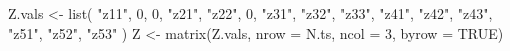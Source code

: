 \begin{Schunk}
\begin{Sinput}
 Z.vals <- list(
   "z11", 0, 0,
   "z21", "z22", 0,
   "z31", "z32", "z33",
   "z41", "z42", "z43",
   "z51", "z52", "z53"
 )
 Z <- matrix(Z.vals, nrow = N.ts, ncol = 3, byrow = TRUE)
\end{Sinput}
\end{Schunk}
